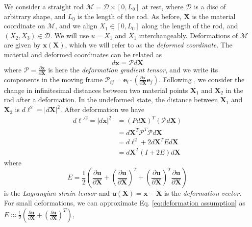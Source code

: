 We consider a straight rod $\mathscr{M}=\mathscr{D} \times [0,L_{0}]$ at rest, where $\mathscr{D}$ is a disc of arbitrary shape, and $L_{0}$ is the length of the rod.
As before, $\mathbf{X}$ is the material coordinate on $\mathscr{M}$, and we align $X_{1}\in[0,L_{0}]$ along the length of the rod, and $(X_{2},X_{3})\in\mathscr{D}$. We will use $u = X_1$ and $X_1$ interchangeably. Deformations of $\mathscr{M}$ are given by $\mathbf{x}(\mathbf{X})$, which we will refer to as the \textit{deformed coordinate}. The material and deformed coordinates can be related as
\begin{equation}
d\mathbf{x}= \mathcal{P} d\mathbf{X}
\end{equation}
where $\mathcal{P} =\frac{\partial\mathbf{x}}{\partial\mathbf{X}}$ is here the \emph{deformation
gradient tensor}, and we write its components in the moving frame $\mathcal{P}_{ij} = \mathbf{e}_i \cdot \left( \frac{\partial\mathbf{x}}{\partial\mathbf{X}} \mathbf{e}_j \right)$. Following \citep{landauTheoryElasticityVolume1986}, we consider
the change in infinitesimal distances between two material points $\mathbf{X}_{1}$ and $\mathbf{X}_{2}$ in the rod after a deformation. In the undeformed
state, the distance between $\mathbf{X}_{1}$ and $\mathbf{X}_{2}$
is $d\ell^{2}=|d\mathbf{X}|^{2}$. After deformation we have
\begin{equation} \label{eq:deformation}
\begin{aligned}d\ell'^{2}=|d\mathbf{x}|^{2} & =(Pd\mathbf{X})^{T}(\mathcal{P} d\mathbf{X})\\
 & =d\mathbf{X}^{T} \mathcal{P}^{T} \mathcal{P} d\mathbf{X}\\
 & =d\ell^{2}+2d\mathbf{X}^{T}Ed\mathbf{X}\\
 & =d\mathbf{X}^{T}(I+2E)d\mathbf{X}
\end{aligned}
\end{equation}
where
\begin{equation} \label{eq:Lagrangian strain tensor}
E=\frac{1}{2}\left(\frac{\partial\mathbf{u}}{\partial\mathbf{X}}+\left(\frac{\partial\mathbf{u}}{\partial\mathbf{X}}\right)^{T}+\left(\frac{\partial\mathbf{u}}{\partial\mathbf{X}}\right)^{T}\frac{\partial\mathbf{u}}{\partial\mathbf{X}}\right) 
\end{equation}
is the \emph{Lagrangian strain tensor} and $\mathbf{u}(\mathbf{X})=\mathbf{x}-\mathbf{X}$ is the \emph{deformation vector}. For small deformations, we can approximate
Eq. \ref{eq:deformation assumption} as $E\approx\frac{1}{2}\left(\frac{\partial\mathbf{u}}{\partial\mathbf{X}}+\left(\frac{\partial\mathbf{u}}{\partial\mathbf{X}}\right)^{T}\right)$,
